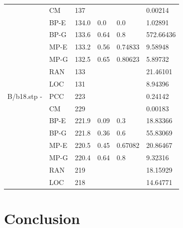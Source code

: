 \documentclass[12pt,a4paper]{article}
\begin{document}
\begin{center}
\begin{tabular}{l|l|l|l|l|l}
		&CM&137&&&0.00214\\
		&BP-E&134.0&0.0&0.0&1.02891\\
		&BP-G&133.6&0.64&0.8&572.66436\\
		&MP-E&133.2&0.56&0.74833&9.58948\\&MP-G&132.5&0.65&0.80623&5.89732\\
		&RAN&133&&&21.46101\\
		&LOC&131&&&8.94396\\\hline
		B/b18.stp - &PCC&223&&&0.24142\\
		&CM&229&&&0.00183\\
		&BP-E&221.9&0.09&0.3&18.83366\\
		&BP-G&221.8&0.36&0.6&55.83069\\
		&MP-E&220.5&0.45&0.67082&20.86467\\&MP-G&220.4&0.64&0.8&9.32316\\
		&RAN&219&&&18.15929\\
		&LOC&218&&&14.64771\\\hline
	\end{tabular}
\end{center}

\section{Conclusion}
\end{document}
